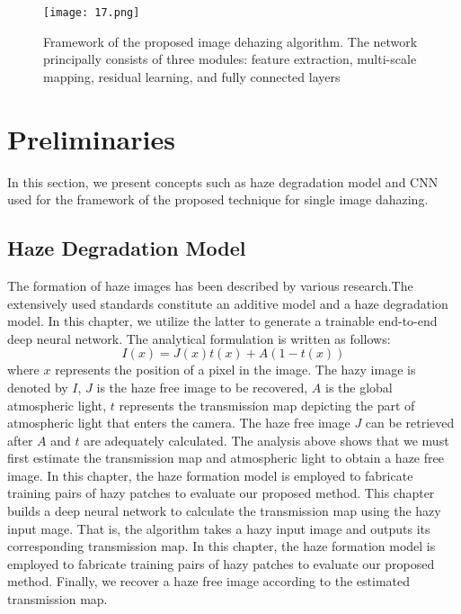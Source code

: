 \documentclass[doctor,english,listoffigures,listoftables]{thesis-uestc}
\begin{document}
\begin{figure}[H]
\texttt{[image: 17.png]}
\caption{Framework of the proposed image dehazing algorithm. The network principally consists of three modules: feature extraction, multi-scale mapping, residual learning, and fully connected layers
}
\label{fig:3}
\end{figure} 

 
\section{ Preliminaries}
In this section, we present concepts such as haze degradation model and CNN used for the framework of the proposed technique for single image dahazing.
\subsection{Haze Degradation Model}
The formation of haze images has been described by various research.The extensively used standards constitute an additive model and a haze degradation model. In this chapter, we utilize the latter to generate a trainable end-to-end deep neural network. The analytical formulation is written as follows: 
 \begin{equation}
I(x)= J(x)t(x) +A(1-t(x))
\end{equation}
where $x$ represents the position of a pixel in the image. The hazy image is denoted by $I$, $J$ is the haze free image to be recovered, $A$ is the global atmospheric light, $t$ represents the transmission map depicting the part of atmospheric light that enters the camera. The haze free image $J$ can be retrieved after $A$ and $t$ are adequately calculated. The analysis above shows that we must first estimate the transmission map and atmospheric light to obtain a haze free image. In this chapter, the haze formation model is employed to fabricate training pairs of hazy patches to evaluate our proposed method. This chapter builds a deep neural network to calculate the transmission map using the hazy input mage. That is, the algorithm takes a hazy input image and outputs its corresponding transmission map. In this chapter, the haze formation model is employed to fabricate training pairs of hazy patches to evaluate our proposed method. Finally, we recover a haze free image according to the estimated transmission map. 
\end{document}
